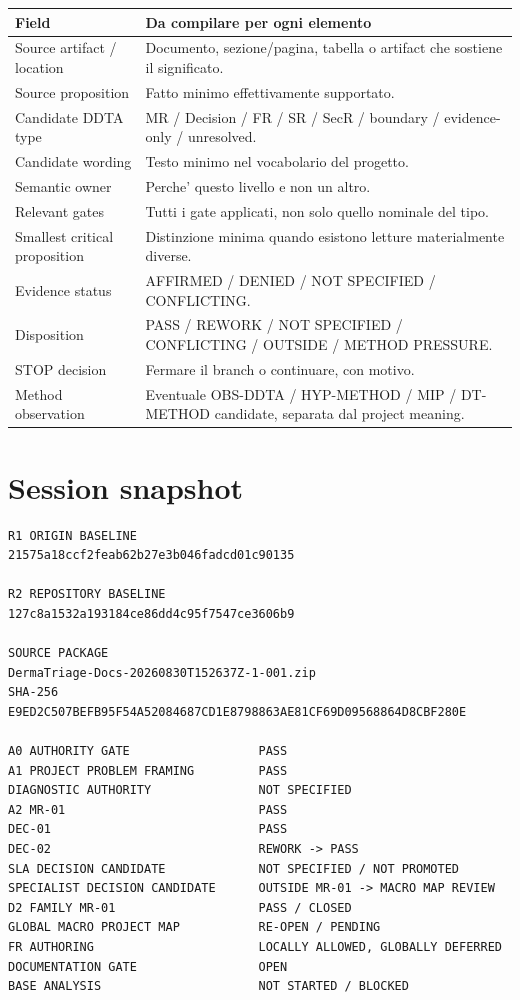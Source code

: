 \documentclass[11pt,a4paper]{article}
\begin{document}
\begin{longtable}{L{45mm}L{105mm}}
\toprule
\textbf{Field} & \textbf{Da compilare per ogni elemento} \\
\midrule
\endhead
Source artifact / location & Documento, sezione/pagina, tabella o artifact che sostiene il significato. \\
Source proposition & Fatto minimo effettivamente supportato. \\
Candidate DDTA type & MR / Decision / FR / SR / SecR / boundary / evidence-only / unresolved. \\
Candidate wording & Testo minimo nel vocabolario del progetto. \\
Semantic owner & Perche' questo livello e non un altro. \\
Relevant gates & Tutti i gate applicati, non solo quello nominale del tipo. \\
Smallest critical proposition & Distinzione minima quando esistono letture materialmente diverse. \\
Evidence status & AFFIRMED / DENIED / NOT SPECIFIED / CONFLICTING. \\
Disposition & PASS / REWORK / NOT SPECIFIED / CONFLICTING / OUTSIDE / METHOD PRESSURE. \\
STOP decision & Fermare il branch o continuare, con motivo. \\
Method observation & Eventuale OBS-DDTA / HYP-METHOD / MIP / DT-METHOD candidate, separata dal project meaning. \\
\bottomrule
\end{longtable}

\section*{Session snapshot}

\begin{lstlisting}
R1 ORIGIN BASELINE
21575a18ccf2feab62b27e3b046fadcd01c90135

R2 REPOSITORY BASELINE
127c8a1532a193184ce86dd4c95f7547ce3606b9

SOURCE PACKAGE
DermaTriage-Docs-20260830T152637Z-1-001.zip
SHA-256
E9ED2C507BEFB95F54A52084687CD1E8798863AE81CF69D09568864D8CBF280E

A0 AUTHORITY GATE                  PASS
A1 PROJECT PROBLEM FRAMING         PASS
DIAGNOSTIC AUTHORITY               NOT SPECIFIED
A2 MR-01                           PASS
DEC-01                             PASS
DEC-02                             REWORK -> PASS
SLA DECISION CANDIDATE             NOT SPECIFIED / NOT PROMOTED
SPECIALIST DECISION CANDIDATE      OUTSIDE MR-01 -> MACRO MAP REVIEW
D2 FAMILY MR-01                    PASS / CLOSED
GLOBAL MACRO PROJECT MAP           RE-OPEN / PENDING
FR AUTHORING                       LOCALLY ALLOWED, GLOBALLY DEFERRED
DOCUMENTATION GATE                 OPEN
BASE ANALYSIS                      NOT STARTED / BLOCKED
\end{lstlisting}
\end{document}
